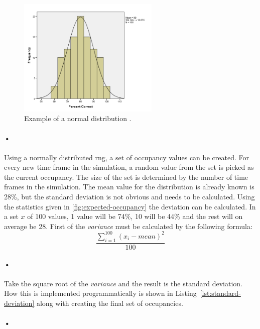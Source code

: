 \documentclass[a4paper, 12pt]{report}
\begin{document}
\begin{figure}[h!]
	\centering
		\includegraphics[width=0.6\textwidth]{images/normal-dist.png}
		\caption[Example of a normal distribution.]{Example of a normal distribution \cite{normal-dist-image}.}
		\label{fig:normal-dist}
\end{figure}

\paragraph{•}
Using a normally distributed \gls{rng}, a set of occupancy values can be created.
For every new time frame in the simulation, a random value from the set is picked as the current occupancy.
The size of the set is determined by the number of time frames in the simulation.
The mean value for the distribution is already known is 28\%, but the standard deviation is not obvious and needs to be calculated.
Using the statistics given in \ref{fig:expected-occupancy} the deviation can be calculated.
In a set $x$ of 100 values, 1 value will be 74\%, 10 will be 44\% and the rest will on average be 28.
First of the \textit{variance} must be calculated by the following formula:
\begin{equation}
\frac{\sum_{i=1}^{100} (x_i - mean)^2}{100}
\end{equation}
\paragraph{•}
Take the square root of the \textit{variance} and the result is the standard deviation.
How this is implemented programmatically is shown in Listing~\ref{lst:standard-deviation} along with creating the final set of occupancies.

\paragraph{•}
\begin{minipage}{\linewidth}

\end{minipage}
\end{document}
